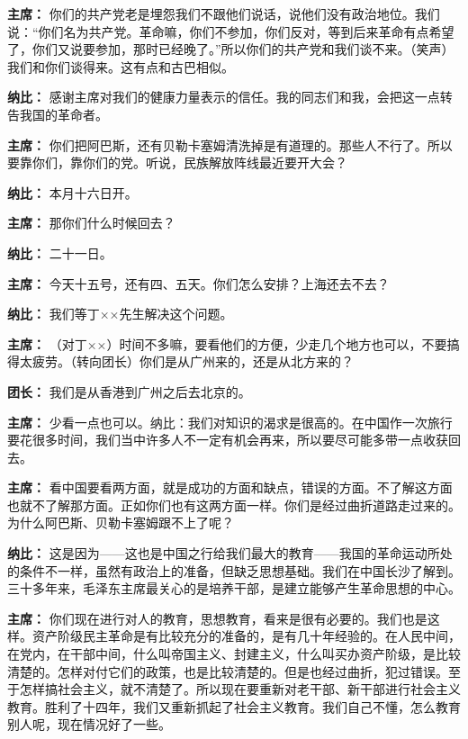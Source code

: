 \begin{duihua}
\item[\textbf{主席：}] 你们的共产党老是埋怨我们不跟他们说话，说他们没有政治地位。我们说：“你们名为共产党。革命嘛，你们不参加，你们反对，等到后来革命有点希望了，你们又说要参加，那时已经晚了。”所以你们的共产党和我们谈不来。（笑声）我们和你们谈得来。这有点和古巴相似。

\item[\textbf{纳比：}] 感谢主席对我们的健康力量表示的信任。我的同志们和我，会把这一点转告我国的革命者。

\item[\textbf{主席：}] 你们把阿巴斯，还有贝勒卡塞姆清洗掉是有道理的。那些人不行了。所以要靠你们，靠你们的党。听说，民族解放阵线最近要开大会？

\item[\textbf{纳比：}] 本月十六日开。

\item[\textbf{主席：}] 那你们什么时候回去？

\item[\textbf{纳比：}] 二十一日。

\item[\textbf{主席：}] 今天十五号，还有四、五天。你们怎么安排？上海还去不去？

\item[\textbf{纳比：}] 我们等丁××先生解决这个问题。

\item[\textbf{主席：}] （对丁××）时间不多嘛，要看他们的方便，少走几个地方也可以，不要搞得太疲劳。（转向团长）你们是从广州来的，还是从北方来的？

\item[\textbf{团长：}] 我们是从香港到广州之后去北京的。

\item[\textbf{主席：}] 少看一点也可以。纳比：我们对知识的渴求是很高的。在中国作一次旅行要花很多时间，我们当中许多人不一定有机会再来，所以要尽可能多带一点收获回去。

\item[\textbf{主席：}] 看中国要看两方面，就是成功的方面和缺点，错误的方面。不了解这方面也就不了解那方面。正如你们也有这两方面一样。你们是经过曲折道路走过来的。为什么阿巴斯、贝勒卡塞姆跟不上了呢？

\item[\textbf{纳比：}] 这是因为——这也是中国之行给我们最大的教育——我国的革命运动所处的条件不一样，虽然有政治上的准备，但缺乏思想基础。我们在中国长沙了解到。三十多年来，毛泽东主席最关心的是培养干部，是建立能够产生革命思想的中心。

\item[\textbf{主席：}] 你们现在进行对人的教育，思想教育，看来是很有必要的。我们也是这样。资产阶级民主革命是有比较充分的准备的，是有几十年经验的。在人民中间，在党内，在干部中间，什么叫帝国主义、封建主义，什么叫买办资产阶级，是比较清楚的。怎样对付它们的政策，也是比较清楚的。但是也经过曲折，犯过错误。至于怎样搞社会主义，就不清楚了。所以现在要重新对老干部、新干部进行社会主义教育。胜利了十四年，我们又重新抓起了社会主义教育。我们自己不懂，怎么教育别人呢，现在情况好了一些。


\end{duihua}
